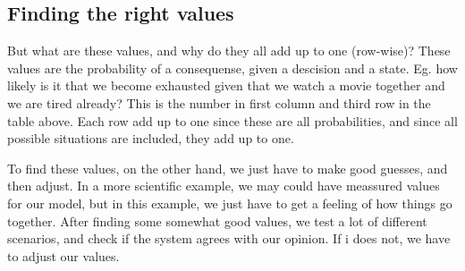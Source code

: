 \subsection{Finding the right values}
But what are these values, and why do they all add up to one (row-wise)?
These values are the probability of a consequense, given a descision and a
state. Eg. how likely is it that we become exhausted given that we watch a movie
together and we are tired already? This is the number in first column and third
row in the table above. Each row add up to one since these are all
probabilities, and since all possible situations are included, they add up to
one.

To find these values, on the other hand, we just have to make good guesses, and
then adjust. In a more scientific example, we may could have meassured values
for our model, but in this example, we just have to get a feeling of how things
go together. After finding some somewhat good values, we test a lot of different
scenarios, and check if the system agrees with our opinion. If i does not, we
have to adjust our values.
